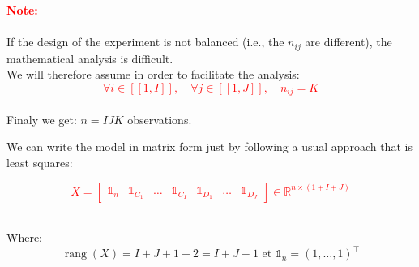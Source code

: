 \documentclass[unknownkeysallowed]{beamer}
\begin{document}
\begin{frame}{}

 
\textcolor{red}{\textbf{Note:}} \\
\\
\vspace{0.5cm}If the design of the experiment is not balanced (i.e., the $n_{i j}$ are different), the mathematical analysis is difficult.\\
\vspace{0.3cm}
We will therefore assume in order to facilitate the analysis:
\textcolor{red}{$$\forall i \in[\![1, I]\!], \quad \forall j \in[\![1, J]\!], \quad n_{i j}=K $$}\\

Finaly we get: $n=IJK$ observations.
\end{frame}


\begin{frame}{}   
We can write the model in matrix form just by  following a usual approach that is least squares:\\

\begin{alertblock}{}
\vspace{1cm}
\textcolor{red}{$$X=\left[\begin{array}{lllllll}
\mathbb{1}_{n} & \mathbb{1}_{C_{1}} & \ldots & \mathbb{1}_{C_{I}} & \mathbb{1}_{D_{1}} & \ldots & \mathbb{1}_{D_{J}}
\end{array}\right] \in \mathbb{R}^{n \times(1+I+J)}$$}
\end{alertblock}\\
Where:\\
$$\operatorname{rang}(X)=I+J+1-2=I+J-1 \text { et } \mathbb{1}_{n}=(1, \ldots, 1)^{\top}$$

\end{frame}
\end{document}
